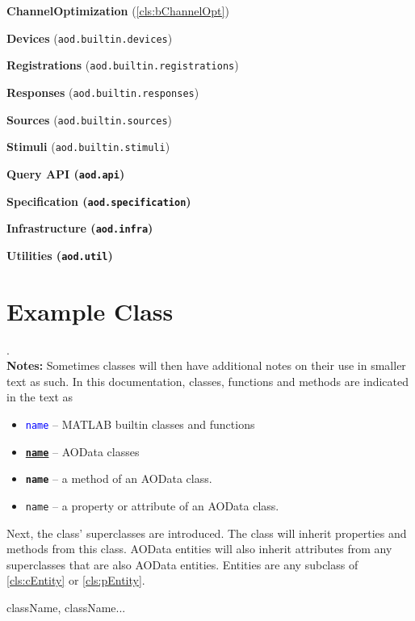 \documentclass{aodatadocs}
\newcommand{\propref}[1]{\texttt{#1}}
\newcommand{\mclass}[1]{\textcolor{blue}{\texttt{#1}}}
\newcommand{\myclass}[1]{\textcolor{blue4}{\texttt{\textbf{\underline{#1}}}}}
\newcommand{\mymethod}[1]{\textcolor{violet4}{\texttt{\textbf{#1}}}}
\begin{document}
{\begin{legal}[font=\Large\bfseries, itemsep=1.5ex]
\begin{legal}[font=\large\bfseries, itemsep=1ex]
        \begin{legal}
            \item \textbf{ChannelOptimization} (\ref{cls:bChannelOpt})
        \end{legal}
        \item {\large\textbf{Devices} (\texttt{aod.builtin.devices})}
        \item {\large\textbf{Registrations} (\texttt{aod.builtin.registrations})}
        \item {\large\textbf{Responses} (\texttt{aod.builtin.responses})}
        \item {\large\textbf{Sources} (\texttt{aod.builtin.sources})}
        \item {\large\textbf{Stimuli} (\texttt{aod.builtin.stimuli})}
    \end{legal}
    \item {\Large\bfseries Query API (\texttt{aod.api})}
    \item {\Large\bfseries Specification (\texttt{aod.specification})}
    \item {\Large\bfseries Infrastructure (\texttt{aod.infra})}
    \item {\Large\bfseries Utilities (\texttt{aod.util})}
\end{legal}
}

\pagebreak
\section*{Example Class}
    .\\$\quad$\\
    \textbf{Notes:} Sometimes classes will then have additional notes on their use in smaller text as such. In this documentation, classes, functions and methods are indicated in the text as
    \begin{itemize} 
        \item \mclass{name} -- MATLAB builtin classes and functions
        \item \myclass{name} -- AOData classes 
        \item \mymethod{name} -- a method of an AOData class.
        \item \propref{name} -- a property or attribute of an AOData class.
    \end{itemize} 
    $\quad$\\
    Next, the class' superclasses are introduced. The class will inherit properties and methods from this class. AOData entities will also inherit attributes from any superclasses that are also AOData entities. Entities are any subclass of \ref{cls:cEntity} or \ref{cls:pEntity}.
    \begin{SuperFlag}
        className, className... 
    \end{SuperFlag}\vspace{2ex}
    
\end{document}
